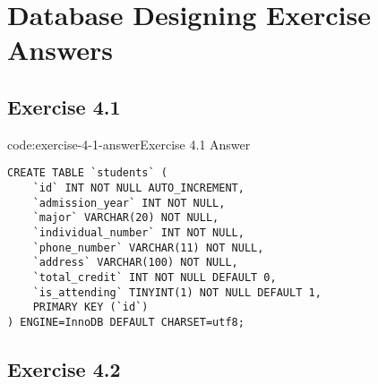 \section{Database Designing Exercise Answers}\label{sect:database-designing-answers}

\subsection*{Exercise 4.1}

\begin{codeenv}{code:exercise-4-1-answer}{Exercise 4.1 Answer}\begin{verbatim}
CREATE TABLE `students` (
    `id` INT NOT NULL AUTO_INCREMENT,
    `admission_year` INT NOT NULL,
    `major` VARCHAR(20) NOT NULL,
    `individual_number` INT NOT NULL,
    `phone_number` VARCHAR(11) NOT NULL,
    `address` VARCHAR(100) NOT NULL,
    `total_credit` INT NOT NULL DEFAULT 0,
    `is_attending` TINYINT(1) NOT NULL DEFAULT 1,
    PRIMARY KEY (`id`)
) ENGINE=InnoDB DEFAULT CHARSET=utf8;
\end{verbatim}
\end{codeenv}

\subsection*{Exercise 4.2}

